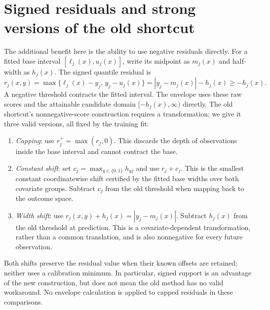 \section{Signed residuals and strong versions of the old shortcut}
\label{sec:signed-experiments}

The additional benefit here is the ability to use negative residuals directly.
For a fitted base interval $[\ell_j(x),u_j(x)]$, write its midpoint as $m_j(x)$
and half-width as $h_j(x)$. The signed quantile residual is
\[
 r_j(x,y)=\max\{\ell_j(x)-y_j,\,y_j-u_j(x)\}
         =|y_j-m_j(x)|-h_j(x)\geq-h_j(x).
\]
A negative threshold contracts the fitted interval. The envelope uses these
raw scores and the attainable candidate domain $[-h_j(x),\infty)$ directly.
The old shortcut's nonnegative-score construction requires a transformation;
we give it three valid versions, all fixed by the training fit:
\begin{enumerate}
\item \emph{Capping}: use $r_j^+=\max(r_j,0)$. This discards the depth of
  observations inside the base interval and cannot contract the base.
\item \emph{Constant shift}: set $c_j=\max_{g\in\{0,1\}}h_{gj}$ and use
  $r_j+c_j$. This is the smallest constant coordinatewise shift certified by
  the fitted base widths over both covariate groups. Subtract $c_j$ from the
  old threshold when mapping back to the outcome space.
\item \emph{Width shift}: use $r_j(x,y)+h_j(x)=|y_j-m_j(x)|$. Subtract
  $h_j(x)$ from the old threshold at prediction. This is a covariate-dependent
  transformation, rather than a common translation, and is also nonnegative
  for every future observation.
\end{enumerate}
Both shifts preserve the residual value when their known offsets are retained;
neither uses a calibration minimum. In particular, signed support is an
advantage of the new construction, but does not mean the old method has no
valid workaround. No envelope calculation is applied to capped residuals in
these comparisons.

